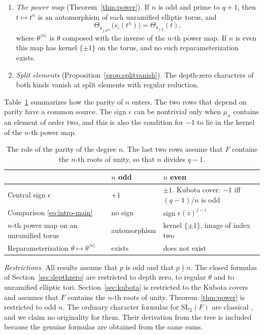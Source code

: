 \documentclass[12pt,letterpaper]{article}
\numberwithin{equation}{section}
\theoremstyle{definition}
\theoremstyle{remark}
\newcommand{\sgn}{\epsilon}
\begin{document}
\begin{enumerate}[leftmargin=2em]
\item \emph{The power map} (Theorem~\ref{thm:power}). If $n$ is odd and prime to $q+1$, then $t\mapsto t^n$ is an automorphism of each unramified elliptic torus, and
\[
 \Theta_{\widetilde\pi_{j,\theta^{\langle n\rangle}}}\bigl(s_i(t^n)\bigr)=\Theta_{\pi_{j,\theta}}(t),
\]
where $\theta^{\langle n\rangle}$ is $\theta$ composed with the inverse of the $n$-th power map. If $n$ is even this map has kernel $\{\pm1\}$ on the torus, and no such reparameterization exists.
\item \emph{Split elements} (Proposition~\ref{prop:splitvanish}). The depth-zero characters of both kinds vanish at split elements with regular reduction.
\end{enumerate}

Table~\ref{tab:parity} summarizes how the parity of $n$ enters. The two rows that depend on parity have a common source. The sign $\sgn$ can be nontrivial only when $\mu_n$ contains an element of order two, and this is also the condition for $-1$ to lie in the kernel of the $n$-th power map.

\begin{table}[ht]
\centering
\caption{The role of the parity of the degree $n$. The last two rows assume that $F$ contains the $n$-th roots of unity, so that $n$ divides $q-1$.}\label{tab:parity}
\vspace{4pt}
\small
\begin{tabular}{@{}lll@{}}
\toprule
 & $n$ odd & $n$ even\\
\midrule
Central sign $\sgn$ & $+1$ & $\pm1$. Kubota cover: $-1$ iff $(q-1)/n$ is odd\\
Comparison \eqref{eq:intro-main} & no sign & sign $\sgn(z)^{j-i}$\\
$n$-th power map on an unramified torus & automorphism & kernel $\{\pm1\}$, image of index two\\
Reparameterization $\theta\mapsto\theta^{\langle n\rangle}$ & exists & does not exist\\
\bottomrule
\end{tabular}
\end{table}

\emph{Restrictions.} All results assume that $p$ is odd and that $p\nmid n$. The closed formulas of Section~\ref{sec:depthzero} are restricted to depth zero, to regular $\theta$ and to unramified elliptic tori. Section~\ref{sec:kubota} is restricted to the Kubota covers and assumes that $F$ contains the $n$-th roots of unity. Theorem~\ref{thm:power} is restricted to odd $n$. The ordinary character formulas for $\mathrm{SL}_2(F)$ are classical \cite{SS68}, and we claim no originality for them. Their derivation from the tree is included because the genuine formulas are obtained from the same sums.
\end{document}
